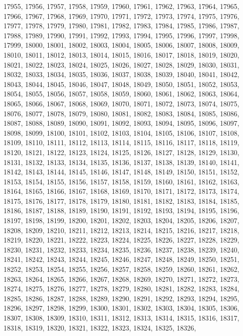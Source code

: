 17955,
17956,
17957,
17958,
17959,
17960,
17961,
17962,
17963,
17964,
17965,
17966,
17967,
17968,
17969,
17970,
17971,
17972,
17973,
17974,
17975,
17976,
17977,
17978,
17979,
17980,
17981,
17982,
17983,
17984,
17985,
17986,
17987,
17988,
17989,
17990,
17991,
17992,
17993,
17994,
17995,
17996,
17997,
17998,
17999,
18000,
18001,
18002,
18003,
18004,
18005,
18006,
18007,
18008,
18009,
18010,
18011,
18012,
18013,
18014,
18015,
18016,
18017,
18018,
18019,
18020,
18021,
18022,
18023,
18024,
18025,
18026,
18027,
18028,
18029,
18030,
18031,
18032,
18033,
18034,
18035,
18036,
18037,
18038,
18039,
18040,
18041,
18042,
18043,
18044,
18045,
18046,
18047,
18048,
18049,
18050,
18051,
18052,
18053,
18054,
18055,
18056,
18057,
18058,
18059,
18060,
18061,
18062,
18063,
18064,
18065,
18066,
18067,
18068,
18069,
18070,
18071,
18072,
18073,
18074,
18075,
18076,
18077,
18078,
18079,
18080,
18081,
18082,
18083,
18084,
18085,
18086,
18087,
18088,
18089,
18090,
18091,
18092,
18093,
18094,
18095,
18096,
18097,
18098,
18099,
18100,
18101,
18102,
18103,
18104,
18105,
18106,
18107,
18108,
18109,
18110,
18111,
18112,
18113,
18114,
18115,
18116,
18117,
18118,
18119,
18120,
18121,
18122,
18123,
18124,
18125,
18126,
18127,
18128,
18129,
18130,
18131,
18132,
18133,
18134,
18135,
18136,
18137,
18138,
18139,
18140,
18141,
18142,
18143,
18144,
18145,
18146,
18147,
18148,
18149,
18150,
18151,
18152,
18153,
18154,
18155,
18156,
18157,
18158,
18159,
18160,
18161,
18162,
18163,
18164,
18165,
18166,
18167,
18168,
18169,
18170,
18171,
18172,
18173,
18174,
18175,
18176,
18177,
18178,
18179,
18180,
18181,
18182,
18183,
18184,
18185,
18186,
18187,
18188,
18189,
18190,
18191,
18192,
18193,
18194,
18195,
18196,
18197,
18198,
18199,
18200,
18201,
18202,
18203,
18204,
18205,
18206,
18207,
18208,
18209,
18210,
18211,
18212,
18213,
18214,
18215,
18216,
18217,
18218,
18219,
18220,
18221,
18222,
18223,
18224,
18225,
18226,
18227,
18228,
18229,
18230,
18231,
18232,
18233,
18234,
18235,
18236,
18237,
18238,
18239,
18240,
18241,
18242,
18243,
18244,
18245,
18246,
18247,
18248,
18249,
18250,
18251,
18252,
18253,
18254,
18255,
18256,
18257,
18258,
18259,
18260,
18261,
18262,
18263,
18264,
18265,
18266,
18267,
18268,
18269,
18270,
18271,
18272,
18273,
18274,
18275,
18276,
18277,
18278,
18279,
18280,
18281,
18282,
18283,
18284,
18285,
18286,
18287,
18288,
18289,
18290,
18291,
18292,
18293,
18294,
18295,
18296,
18297,
18298,
18299,
18300,
18301,
18302,
18303,
18304,
18305,
18306,
18307,
18308,
18309,
18310,
18311,
18312,
18313,
18314,
18315,
18316,
18317,
18318,
18319,
18320,
18321,
18322,
18323,
18324,
18325,
18326,
